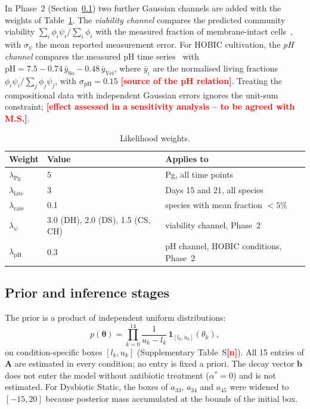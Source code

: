 \documentclass[pdflatex,sn-mathphys-num,lineno]{sn-jnl}
\newcommand{\btheta}{\boldsymbol{\theta}}
\newcommand{\TBD}[1]{\textcolor{red}{\textbf{[#1]}}}
\begin{document}
In Phase~2 (Section~\ref{sec:prior}) two further Gaussian channels are added with the weights of Table~\ref{tab:weights}.
The \emph{viability channel} compares the predicted community viability $\sum_i\phi_i\psi_i/\sum_i\phi_i$ with the measured fraction of membrane-intact cells~\cite{heine2025influence}, with $\sigma_\psi$ the mean reported measurement error.
For HOBIC cultivation, the \emph{pH channel} compares the measured pH time series~\cite{heine2025influence} with $\mathrm{pH}=7.5-0.74\,\bar{y}_{\mathrm{So}}-0.48\,\bar{y}_{\mathrm{Vei}}$, where $\bar{y}_i$ are the normalised living fractions $\phi_i\psi_i/\sum_j\phi_j\psi_j$, with $\sigma_{\mathrm{pH}}=0.15$ \TBD{source of the pH relation}.
Treating the compositional data with independent Gaussian errors ignores the unit-sum constraint; \TBD{effect assessed in a sensitivity analysis -- to be agreed with M.S.}.

\begin{table}[htbp]\centering\small
\begin{tabular}{@{}lll@{}}\toprule
Weight & Value & Applies to\\\midrule
$\lambda_{\mathrm{Pg}}$ & 5 & Pg, all time points\\
$\lambda_{\mathrm{late}}$ & 3 & Days 15 and 21, all species\\
$\lambda_{\mathrm{rare}}$ & 0.1 & species with mean fraction $<5\%$\\
$\lambda_{\psi}$ & 3.0 (DH), 2.0 (DS), 1.5 (CS, CH) & viability channel, Phase~2\\
$\lambda_{\mathrm{pH}}$ & 0.3 & pH channel, HOBIC conditions, Phase~2\\\bottomrule
\end{tabular}
\caption{Likelihood weights.}
\label{tab:weights}
\end{table}

\subsection{Prior and inference stages}
\label{sec:prior}

The prior is a product of independent uniform distributions:
\begin{equation}
p(\btheta) = \prod_{k=0}^{14} \frac{1}{u_k-l_k}\,\mathbf{1}_{[l_k,u_k]}(\theta_k),
\label{eq:prior}
\end{equation}
on condition-specific boxes $[l_k,u_k]$ (Supplementary Table~S\TBD{n}).
All 15 entries of $\mathbf{A}$ are estimated in every condition; no entry is fixed a priori.
The decay vector $\mathbf{b}$ does not enter the model without antibiotic treatment ($\alpha^*=0$) and is not estimated.
For Dysbiotic Static, the boxes of $a_{33}$, $a_{34}$ and $a_{45}$ were widened to $[-15,20]$ because posterior mass accumulated at the bounds of the initial box.
\end{document}
